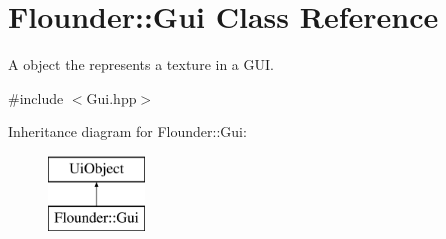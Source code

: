 \hypertarget{class_flounder_1_1_gui}{}\section{Flounder\+:\+:Gui Class Reference}
\label{class_flounder_1_1_gui}


A object the represents a texture in a G\+UI.  




{\ttfamily \#include $<$Gui.\+hpp$>$}

Inheritance diagram for Flounder\+:\+:Gui\+:\begin{figure}[H]
\begin{center}
\leavevmode
\includegraphics[height=2.000000cm]{class_flounder_1_1_gui}
\end{center}
\end{figure}
